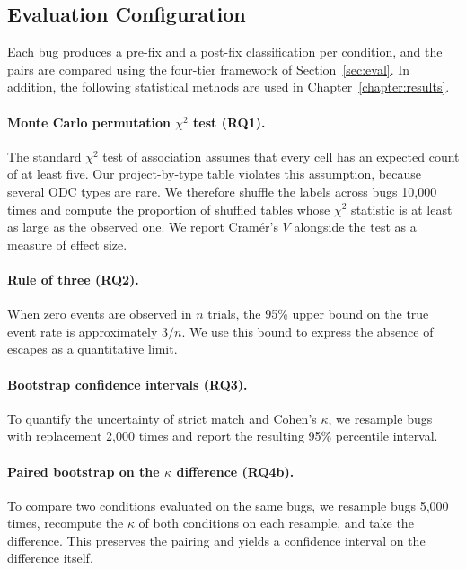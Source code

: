 \documentclass{iutbscthesis}
\begin{document}
\subsection{Evaluation Configuration}
\label{sec:stats}

Each bug produces a pre-fix and a post-fix classification per condition, and the pairs are compared using the four-tier framework of Section~\ref{sec:eval}. In addition, the following statistical methods are used in Chapter~\ref{chapter:results}.

\paragraph{Monte Carlo permutation $\chi^2$ test (RQ1).} The standard $\chi^2$ test of association assumes that every cell has an expected count of at least five. Our project-by-type table violates this assumption, because several ODC types are rare. We therefore shuffle the labels across bugs 10{,}000 times and compute the proportion of shuffled tables whose $\chi^2$ statistic is at least as large as the observed one. We report Cram\'er's $V$ alongside the test as a measure of effect size.

\paragraph{Rule of three (RQ2).} When zero events are observed in $n$ trials, the 95\% upper bound on the true event rate is approximately $3/n$. We use this bound to express the absence of escapes as a quantitative limit.

\paragraph{Bootstrap confidence intervals (RQ3).} To quantify the uncertainty of strict match and Cohen's $\kappa$, we resample bugs with replacement 2{,}000 times and report the resulting 95\% percentile interval.

\paragraph{Paired bootstrap on the $\kappa$ difference (RQ4b).} To compare two conditions evaluated on the same bugs, we resample bugs 5{,}000 times, recompute the $\kappa$ of both conditions on each resample, and take the difference. This preserves the pairing and yields a confidence interval on the difference itself.
\end{document}

